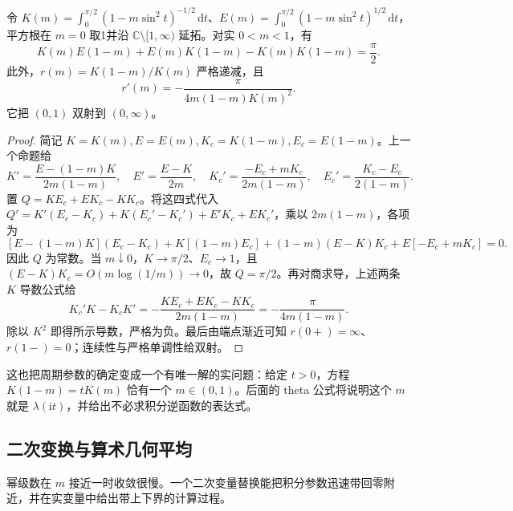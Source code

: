 \begin{proposition}\label{b3:prop:F-legendre-relation}
令 \(K(m)=\int_0^{\pi/2}(1-m\sin^2t)^{-1/2}\,\mathrm dt\)、\(E(m)=\int_0^{\pi/2}(1-m\sin^2t)^{1/2}\,\mathrm dt\)，平方根在 \(m=0\) 取1并沿 \(\mathbb C\setminus[1,\infty)\) 延拓。对实 \(0<m<1\)，有
\[
K(m)E(1-m)+E(m)K(1-m)-K(m)K(1-m)=\frac\pi2.
\]
此外，\(r(m)=K(1-m)/K(m)\) 严格递减，且
\[
r'(m)=-\frac{\pi}{4m(1-m)K(m)^2}.
\]
它把 \((0,1)\) 双射到 \((0,\infty)\)。
\end{proposition}
\begin{proof}
简记 \(K=K(m),E=E(m),K_c=K(1-m),E_c=E(1-m)\)。上一个命题给
\[
K'=\frac{E-(1-m)K}{2m(1-m)},\quad E'=\frac{E-K}{2m},\quad
K_c'=\frac{-E_c+mK_c}{2m(1-m)},\quad
E_c'=\frac{K_c-E_c}{2(1-m)}.
\]
置 \(Q=KE_c+EK_c-KK_c\)。将这四式代入
\(Q'=K'(E_c-K_c)+K(E_c'-K_c')+E'K_c+EK_c'\)，乘以 \(2m(1-m)\)，各项为
\[
[E-(1-m)K](E_c-K_c)+K[(1-m)E_c]
+(1-m)(E-K)K_c+E[-E_c+mK_c]=0.
\]
因此 \(Q\) 为常数。当 \(m\downarrow0\)，\(K\to\pi/2\)、\(E_c\to1\)，且
\((E-K)K_c=O(m\log(1/m))\to0\)，故 \(Q=\pi/2\)。再对商求导，上述两条 \(K\) 导数公式给
\[
K_c'K-K_cK'=-\frac{KE_c+EK_c-KK_c}{2m(1-m)}
=-\frac{\pi}{4m(1-m)}.
\]
除以 \(K^2\) 即得所示导数，严格为负。最后由端点渐近可知 \(r(0+)=\infty\)、\(r(1-)=0\)；连续性与严格单调性给双射。
\end{proof}
这也把周期参数的确定变成一个有唯一解的实问题：给定 \(t>0\)，方程 \(K(1-m)=tK(m)\) 恰有一个 \(m\in(0,1)\)。后面的 theta 公式将说明这个 \(m\) 就是 \(\lambda(\mathrm{i}t)\)，并给出不必求积分逆函数的表达式。

\subsection{二次变换与算术几何平均}
\label{b3:subsec:F0404}

幂级数在 \(m\) 接近一时收敛很慢。一个二次变量替换能把积分参数迅速带回零附近，并在实变量中给出带上下界的计算过程。

